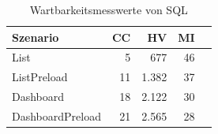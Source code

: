 \begin{table}[ht]
\centering
\caption{Wartbarkeitsmesswerte von SQL}
\begin{tabular}{lrrrr}
\toprule
Szenario & CC & HV & MI \\
\midrule
	List & 5 & 677 & 46 \\
	ListPreload & 11 & 1.382 & 37 \\
	Dashboard & 18 & 2.122 & 30 \\
	DashboardPreload & 21 & 2.565 & 28 \\
\bottomrule
\end{tabular}
\label{tab:wartbarkeit_sql}
\end{table}
	